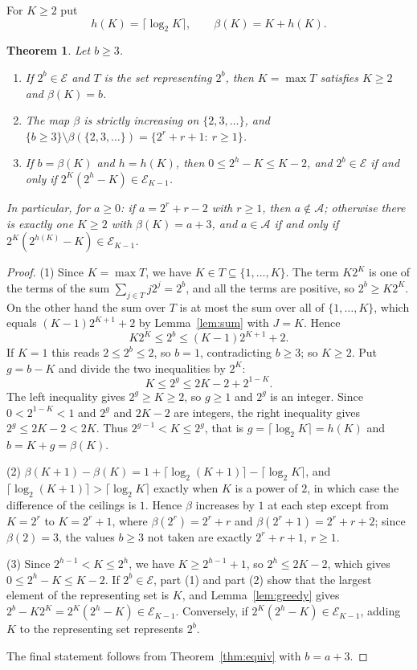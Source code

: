 \documentclass[11pt]{amsart}
\newtheorem{Theorem}{Theorem}[section]
\theoremstyle{definition}
\begin{document}
For $K\ge2$ put
\begin{equation}
\label{eq:beta}
h(K)=\lceil\log_2K\rceil,\qquad \beta(K)=K+h(K).
\end{equation}

\begin{Theorem}
\label{thm:leading}
Let $b\ge3$.
\begin{enumerate}
\item If $2^b\in\mathcal{E}$ and $T$ is the set representing $2^b$, then $K=\max T$ satisfies $K\ge2$ and $\beta(K)=b$.
\item The map $\beta$ is strictly increasing on $\{2,3,\dots\}$, and $\{b\ge3\}\setminus\beta(\{2,3,\dots\})=\{2^r+r+1:\ r\ge1\}$.
\item If $b=\beta(K)$ and $h=h(K)$, then $0\le2^h-K\le K-2$, and $2^b\in\mathcal{E}$ if and only if $2^K(2^h-K)\in\mathcal{E}_{K-1}$.
\end{enumerate}
In particular, for $a\ge0$: if $a=2^r+r-2$ with $r\ge1$, then $a\notin\mathcal{A}$; otherwise there is exactly one $K\ge2$ with $\beta(K)=a+3$, and $a\in\mathcal{A}$ if and only if $2^K(2^{h(K)}-K)\in\mathcal{E}_{K-1}$.
\end{Theorem}
\begin{proof}
(1) Since $K=\max T$, we have $K\in T\subseteq\{1,\dots,K\}$. The term $K2^K$ is one of the terms of the sum $\sum_{j\in T}j2^j=2^b$, and all the terms are positive, so $2^b\ge K2^K$. On the other hand the sum over $T$ is at most the sum over all of $\{1,\dots,K\}$, which equals $(K-1)2^{K+1}+2$ by Lemma~\ref{lem:sum} with $J=K$. Hence
\[
K2^K\le2^b\le(K-1)2^{K+1}+2.
\]
If $K=1$ this reads $2\le2^b\le2$, so $b=1$, contradicting $b\ge3$; so $K\ge2$. Put $g=b-K$ and divide the two inequalities by $2^K$:
\[
K\le2^g\le2K-2+2^{1-K}.
\]
The left inequality gives $2^g\ge K\ge2$, so $g\ge1$ and $2^g$ is an integer. Since $0<2^{1-K}<1$ and $2^g$ and $2K-2$ are integers, the right inequality gives $2^g\le2K-2<2K$. Thus $2^{g-1}<K\le2^g$, that is $g=\lceil\log_2K\rceil=h(K)$ and $b=K+g=\beta(K)$.

(2) $\beta(K+1)-\beta(K)=1+\lceil\log_2(K+1)\rceil-\lceil\log_2K\rceil$, and $\lceil\log_2(K+1)\rceil>\lceil\log_2K\rceil$ exactly when $K$ is a power of $2$, in which case the difference of the ceilings is $1$. Hence $\beta$ increases by $1$ at each step except from $K=2^r$ to $K=2^r+1$, where $\beta(2^r)=2^r+r$ and $\beta(2^r+1)=2^r+r+2$; since $\beta(2)=3$, the values $b\ge3$ not taken are exactly $2^r+r+1$, $r\ge1$.

(3) Since $2^{h-1}<K\le2^h$, we have $K\ge2^{h-1}+1$, so $2^h\le2K-2$, which gives $0\le2^h-K\le K-2$. If $2^b\in\mathcal{E}$, part (1) and part (2) show that the largest element of the representing set is $K$, and Lemma~\ref{lem:greedy} gives $2^b-K2^K=2^K(2^h-K)\in\mathcal{E}_{K-1}$. Conversely, if $2^K(2^h-K)\in\mathcal{E}_{K-1}$, adding $K$ to the representing set represents $2^b$.

The final statement follows from Theorem~\ref{thm:equiv} with $b=a+3$.
\end{proof}
\end{document}

